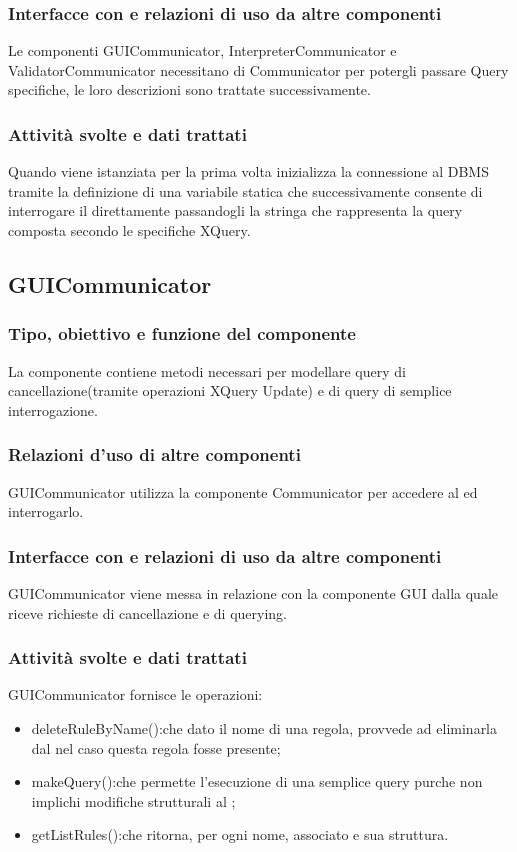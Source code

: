 \documentclass[11pt,titlepage,a4paper]{report}
\begin{document}
\subsubsection{Interfacce con e relazioni di uso da altre componenti}
Le componenti GUICommunicator, InterpreterCommunicator e ValidatorCommunicator necessitano di Communicator per potergli passare Query specifiche, le loro descrizioni sono trattate successivamente.
\subsubsection{Attivit\`a svolte e dati trattati}
Quando viene istanziata per la prima volta inizializza la connessione al DBMS tramite la definizione di una variabile statica che successivamente consente di interrogare il \re direttamente passandogli la stringa che rappresenta la query composta secondo le specifiche XQuery.
%
\subsection{GUICommunicator}
\subsubsection{Tipo, obiettivo e funzione del componente}
La componente contiene metodi necessari per modellare query di cancellazione(tramite operazioni XQuery Update) e di query di semplice interrogazione.
\subsubsection{Relazioni d'uso di altre componenti}
GUICommunicator utilizza la componente Communicator per accedere al \re ed interrogarlo.
\subsubsection{Interfacce con e relazioni di uso da altre componenti}
GUICommunicator viene messa in relazione con la componente GUI dalla quale riceve richieste di cancellazione e di querying.%
\subsubsection{Attivit\`a svolte e dati trattati}
GUICommunicator fornisce le operazioni:
\begin{itemize}
 \item deleteRuleByName():che dato il nome di una regola, provvede ad eliminarla dal \re nel caso questa regola fosse presente;
 \item makeQuery():che permette l'esecuzione di una semplice query purche non implichi modifiche strutturali al \re;
 \item getListRules():che ritorna, per ogni \br nome, \bo associato e sua struttura.
\end{itemize}
\end{document}
